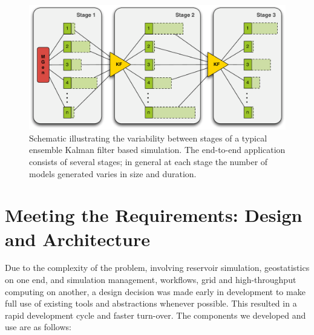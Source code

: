 \documentclass{rspublic}
\begin{document}
\begin{figure}
\begin{center}
\includegraphics*[scale=0.33,angle=0]{figures/3StageKalmanFilter}
\end{center}
\caption{Schematic illustrating the variability between stages of a typical
  ensemble Kalman filter based simulation. The end-to-end
  application consists of several stages; in general at each stage the
  number of models generated varies in size and duration.}
\label{fig:irregular_execution}
\end{figure}


\section{Meeting the Requirements: Design and Architecture}

Due to the complexity of the problem, involving reservoir simulation,
geostatistics on one end, and simulation management, workflows, grid
and high-throughput computing on another, a design decision was made
early in development to make full use of existing tools and
abstractions whenever possible. This resulted in a rapid development
cycle and faster turn-over. The components we developed and use are as
follows:
\end{document}
